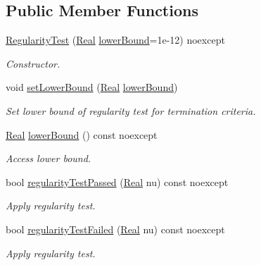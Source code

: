 \subsection*{Public Member Functions}
\begin{DoxyCompactItemize}
\item 
\hyperlink{classSpacy_1_1Mixin_1_1RegularityTest_ae2887fec9a5bdd42239b3df6750bf2e9_ae2887fec9a5bdd42239b3df6750bf2e9}{Regularity\+Test} (\hyperlink{classSpacy_1_1Real}{Real} \hyperlink{classSpacy_1_1Mixin_1_1RegularityTest_a8a807e4449e6b6b64e7e81834d331597_a8a807e4449e6b6b64e7e81834d331597}{lower\+Bound}=1e-\/12) noexcept
\begin{DoxyCompactList}\small\item\em Constructor. \end{DoxyCompactList}\item 
void \hyperlink{classSpacy_1_1Mixin_1_1RegularityTest_a051394f2ffb0abd9a26ab7a64c590eee_a051394f2ffb0abd9a26ab7a64c590eee}{set\+Lower\+Bound} (\hyperlink{classSpacy_1_1Real}{Real} \hyperlink{classSpacy_1_1Mixin_1_1RegularityTest_a8a807e4449e6b6b64e7e81834d331597_a8a807e4449e6b6b64e7e81834d331597}{lower\+Bound})
\begin{DoxyCompactList}\small\item\em Set lower bound of regularity test for termination criteria. \end{DoxyCompactList}\item 
\hyperlink{classSpacy_1_1Real}{Real} \hyperlink{classSpacy_1_1Mixin_1_1RegularityTest_a8a807e4449e6b6b64e7e81834d331597_a8a807e4449e6b6b64e7e81834d331597}{lower\+Bound} () const noexcept
\begin{DoxyCompactList}\small\item\em Access lower bound. \end{DoxyCompactList}\item 
bool \hyperlink{classSpacy_1_1Mixin_1_1RegularityTest_afe2fd3259850b874a85779d4f562e7f6_afe2fd3259850b874a85779d4f562e7f6}{regularity\+Test\+Passed} (\hyperlink{classSpacy_1_1Real}{Real} nu) const noexcept
\begin{DoxyCompactList}\small\item\em Apply regularity test. \end{DoxyCompactList}\item 
bool \hyperlink{classSpacy_1_1Mixin_1_1RegularityTest_a26217e26765bb6f938224ea76612c8c0_a26217e26765bb6f938224ea76612c8c0}{regularity\+Test\+Failed} (\hyperlink{classSpacy_1_1Real}{Real} nu) const noexcept
\begin{DoxyCompactList}\small\item\em Apply regularity test. \end{DoxyCompactList}\item 

\end{DoxyCompactItemize}
